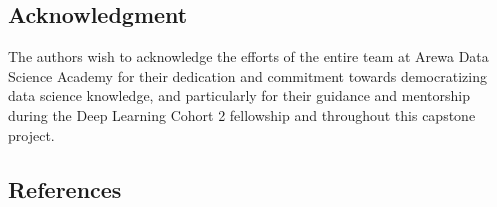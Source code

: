 \documentclass[
  journal,
]{IEEEtran}%
\begin{document}
\subsection*{Acknowledgment}\label{acknowledgment}

The authors wish to acknowledge the efforts of the entire team at Arewa
Data Science Academy for their dedication and commitment towards
democratizing data science knowledge, and particularly for their
guidance and mentorship during the Deep Learning Cohort 2 fellowship and
throughout this capstone project.

\subsection*{References}\label{references}
\end{document}
